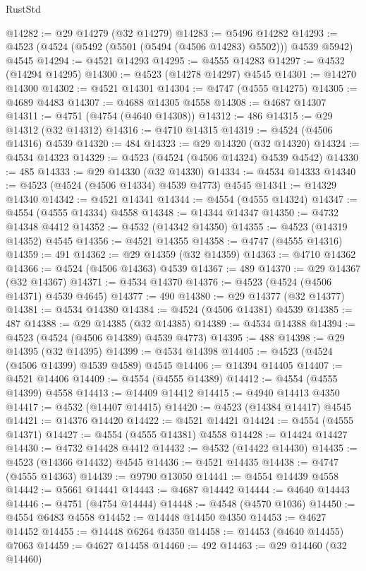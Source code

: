 \begin{lexlean}{RustStd}
\begin{coremodule}
@14282 := @29 @14279 (@32 @14279)
@14283 := @5496 @14282
@14293 := @4523 (@4524 (@5492 (@5501 (@5494 (@4506 @14283) @5502))) @4539 @5942) @4545
@14294 := @4521 @14293
@14295 := @4555 @14283
@14297 := @4532 (@14294 @14295)
@14300 := @4523 (@14278 @14297) @4545
@14301 := @14270 @14300
@14302 := @4521 @14301
@14304 := @4747 (@4555 @14275)
@14305 := @4689 @4483
@14307 := @4688 @14305 @4558
@14308 := @4687 @14307
@14311 := @4751 (@4754 (@4640 @14308))
@14312 := 486
@14315 := @29 @14312 (@32 @14312)
@14316 := @4710 @14315
@14319 := @4524 (@4506 @14316) @4539
@14320 := 484
@14323 := @29 @14320 (@32 @14320)
@14324 := @4534 @14323
@14329 := @4523 (@4524 (@4506 @14324) @4539 @4542)
@14330 := 485
@14333 := @29 @14330 (@32 @14330)
@14334 := @4534 @14333
@14340 := @4523 (@4524 (@4506 @14334) @4539 @4773) @4545
@14341 := @14329 @14340
@14342 := @4521 @14341
@14344 := @4554 (@4555 @14324)
@14347 := @4554 (@4555 @14334) @4558
@14348 := @14344 @14347
@14350 := @4732 @14348 @4412
@14352 := @4532 (@14342 @14350)
@14355 := @4523 (@14319 @14352) @4545
@14356 := @4521 @14355
@14358 := @4747 (@4555 @14316)
@14359 := 491
@14362 := @29 @14359 (@32 @14359)
@14363 := @4710 @14362
@14366 := @4524 (@4506 @14363) @4539
@14367 := 489
@14370 := @29 @14367 (@32 @14367)
@14371 := @4534 @14370
@14376 := @4523 (@4524 (@4506 @14371) @4539 @4645)
@14377 := 490
@14380 := @29 @14377 (@32 @14377)
@14381 := @4534 @14380
@14384 := @4524 (@4506 @14381) @4539
@14385 := 487
@14388 := @29 @14385 (@32 @14385)
@14389 := @4534 @14388
@14394 := @4523 (@4524 (@4506 @14389) @4539 @4773)
@14395 := 488
@14398 := @29 @14395 (@32 @14395)
@14399 := @4534 @14398
@14405 := @4523 (@4524 (@4506 @14399) @4539 @4589) @4545
@14406 := @14394 @14405
@14407 := @4521 @14406
@14409 := @4554 (@4555 @14389)
@14412 := @4554 (@4555 @14399) @4558
@14413 := @14409 @14412
@14415 := @4940 @14413 @4350
@14417 := @4532 (@14407 @14415)
@14420 := @4523 (@14384 @14417) @4545
@14421 := @14376 @14420
@14422 := @4521 @14421
@14424 := @4554 (@4555 @14371)
@14427 := @4554 (@4555 @14381) @4558
@14428 := @14424 @14427
@14430 := @4732 @14428 @4412
@14432 := @4532 (@14422 @14430)
@14435 := @4523 (@14366 @14432) @4545
@14436 := @4521 @14435
@14438 := @4747 (@4555 @14363)
@14439 := @9790 @13050
@14441 := @4554 @14439 @4558
@14442 := @5661 @14441
@14443 := @4687 @14442
@14444 := @4640 @14443
@14446 := @4751 (@4754 @14444)
@14448 := @4548 (@4570 @1036)
@14450 := @4554 @6483 @4558
@14452 := @14448 @14450 @4350
@14453 := @4627 @14452
@14455 := @14448 @6264 @4350
@14458 := @14453 (@4640 @14455) @7063
@14459 := @4627 @14458
@14460 := 492
@14463 := @29 @14460 (@32 @14460)

\end{coremodule}
\end{lexlean}
